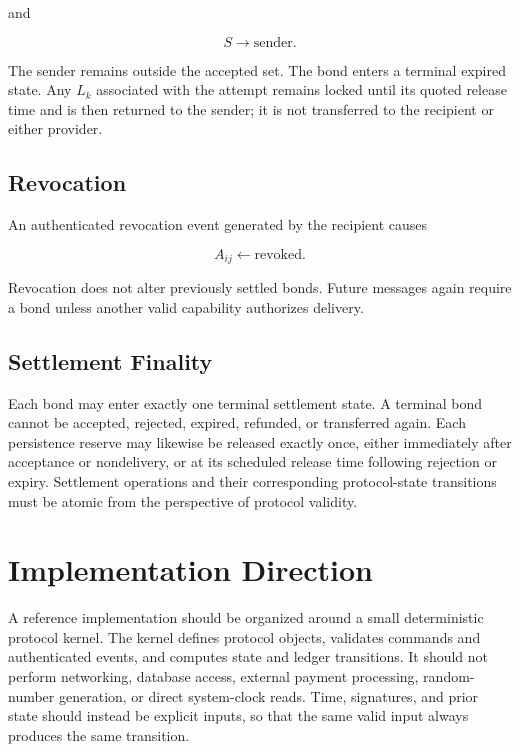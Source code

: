 \documentclass[11pt]{article}
\begin{document}
and

\begin{equation}
S\rightarrow\text{sender}.
\end{equation}

The sender remains outside the accepted set. The bond enters a terminal expired state. Any $L_k$ associated with the attempt remains locked until its quoted release time and is then returned to the sender; it is not transferred to the recipient or either provider.

\subsection*{Revocation}

An authenticated revocation event generated by the recipient causes

\begin{equation}
A_{ij}\leftarrow\text{revoked}.
\end{equation}

Revocation does not alter previously settled bonds. Future messages again require a bond unless another valid capability authorizes delivery.

\subsection*{Settlement Finality}

Each bond may enter exactly one terminal settlement state. A terminal bond cannot be accepted, rejected, expired, refunded, or transferred again. Each persistence reserve may likewise be released exactly once, either immediately after acceptance or nondelivery, or at its scheduled release time following rejection or expiry. Settlement operations and their corresponding protocol-state transitions must be atomic from the perspective of protocol validity.

\section{Implementation Direction}

A reference implementation should be organized around a small deterministic protocol kernel. The kernel defines protocol objects, validates commands and authenticated events, and computes state and ledger transitions. It should not perform networking, database access, external payment processing, random-number generation, or direct system-clock reads. Time, signatures, and prior state should instead be explicit inputs, so that the same valid input always produces the same transition.
\end{document}
